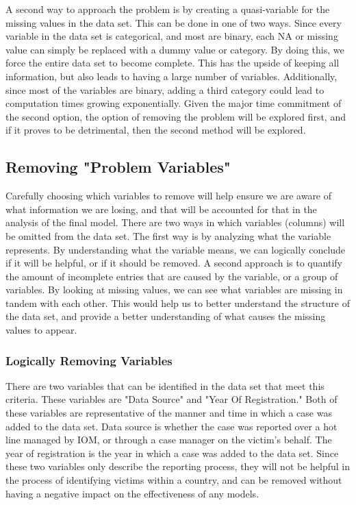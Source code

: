\documentclass{article} %
\begin{document}
	A second way to approach the problem is by creating a quasi-variable for the missing values in the data set. This can be done in one of two ways. Since every variable in the data set is categorical, and most are binary, each NA or missing value can simply be replaced with a dummy value or category. By doing this, we force the entire data set to become complete. This has the upside of keeping all information, but also leads to having a large number of variables. Additionally, since most of the variables are binary, adding a third category could lead to computation times growing exponentially. Given the major time commitment of the second option, the option of removing the problem will be explored first, and if it proves to be detrimental, then the second method will be explored.
	
	
	
	\subsection{Removing "Problem Variables"}
	
	
	Carefully choosing which variables to remove will help ensure we are aware of what information we are losing, and that will be accounted for that in the analysis of the final model. There are two ways in which variables (columns) will be omitted from the data set. The first way is by analyzing what the variable represents. By understanding what the variable means, we can logically conclude if it will be helpful, or if it should be removed. A second approach is to quantify the amount of incomplete entries that are caused by the variable, or a group of variables. By looking at missing values, we can see what variables are missing in tandem with each other. This would help us to better understand the structure of the data set, and provide a better understanding of what causes the missing values to appear.
	
	\subsubsection{Logically Removing Variables} \label{LogicallyRemovingVars}
	 
	
	There are two variables that can be identified in the data set that meet this criteria. These variables are "Data Source" and "Year Of Registration." Both of these variables are representative of the manner and time in which a case was added to the data set. Data source is whether the case was reported over a hot line managed by IOM, or through a case manager on the victim's behalf. The year of registration is the year in which a case was added to the data set. Since these two variables only describe the reporting process, they will not be helpful in the process of identifying victims within a country, and can be removed without having a negative impact on the effectiveness of any models.
	
\end{document}
